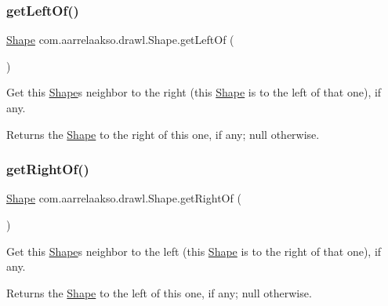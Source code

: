 \subsubsection{\texorpdfstring{get\+Left\+Of()}{getLeftOf()}}
{\footnotesize\ttfamily \hyperlink{classcom_1_1aarrelaakso_1_1drawl_1_1_shape}{Shape} com.\+aarrelaakso.\+drawl.\+Shape.\+get\+Left\+Of (\begin{DoxyParamCaption}{ }\end{DoxyParamCaption})\hspace{0.3cm}{\ttfamily [inherited]}}

Get this \hyperlink{classcom_1_1aarrelaakso_1_1drawl_1_1_shape}{Shape}\textquotesingle{}s neighbor to the right (this \hyperlink{classcom_1_1aarrelaakso_1_1drawl_1_1_shape}{Shape} is to the left of that one), if any.

\begin{DoxyReturn}{Returns}
the \hyperlink{classcom_1_1aarrelaakso_1_1drawl_1_1_shape}{Shape} to the right of this one, if any; {\ttfamily null} otherwise. 
\end{DoxyReturn}
\mbox{\label{classcom_1_1aarrelaakso_1_1drawl_1_1_shape_a1ad573b06f341aa79f6a255a476ae6e4}} 
\subsubsection{\texorpdfstring{get\+Right\+Of()}{getRightOf()}}
{\footnotesize\ttfamily \hyperlink{classcom_1_1aarrelaakso_1_1drawl_1_1_shape}{Shape} com.\+aarrelaakso.\+drawl.\+Shape.\+get\+Right\+Of (\begin{DoxyParamCaption}{ }\end{DoxyParamCaption})\hspace{0.3cm}{\ttfamily [inherited]}}

Get this \hyperlink{classcom_1_1aarrelaakso_1_1drawl_1_1_shape}{Shape}\textquotesingle{}s neighbor to the left (this \hyperlink{classcom_1_1aarrelaakso_1_1drawl_1_1_shape}{Shape} is to the right of that one), if any.

\begin{DoxyReturn}{Returns}
the \hyperlink{classcom_1_1aarrelaakso_1_1drawl_1_1_shape}{Shape} to the left of this one, if any; {\ttfamily null} otherwise. 
\end{DoxyReturn}
\mbox{\label{classcom_1_1aarrelaakso_1_1drawl_1_1_shape_a4e1d54c7e161e3af5053939ddefdf9e6}} 
